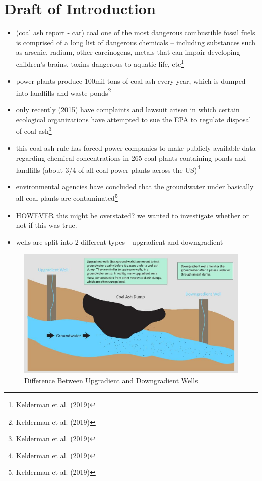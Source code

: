 \documentclass[12pt, twoside]{amherstthesis}
\begin{document}
\hypertarget{draft-of-introduction}{%
\section{Draft of Introduction}\label{draft-of-introduction}}
\begin{itemize}
\item
  (coal ash report - car) coal one of the most dangerous combustible fossil fuels is comprised of a long list of dangerous chemicals -- including substances such as arsenic, radium, other carcinogens, metals that can impair developing children's brains, toxins dangerous to aquatic life, etc\footnote{Kelderman et al. (2019)}
\item
  power plants produce 100mil tons of coal ash every year, which is dumped into landfills and waste ponds\footnote{Kelderman et al. (2019)}
\item
  only recently (2015) have complaints and lawsuit arisen in which certain ecological organizations have attempted to sue the EPA to regulate disposal of coal ash\footnote{Kelderman et al. (2019)}
\item
  this coal ash rule has forced power companies to make publicly available data regarding chemical concentrations in 265 coal plants containing ponds and landfills (about 3/4 of all coal power plants across the US)\footnote{Kelderman et al. (2019)}
\item
  environmental agencies have concluded that the groundwater under basically all coal plants are contaminated\footnote{Kelderman et al. (2019)}
\item
  HOWEVER this might be overstated? we wanted to investigate whether or not if this was true.
\item
  wells are split into 2 different types - upgradient and downgradient
\end{itemize}
\begin{figure}

{\centering \includegraphics[width=1\linewidth]{figures/upgradientdowngradient} 

}

\caption{Difference Between Upgradient and Downgradient Wells}\label{fig:upgradientdowngradient}
\end{figure}
\end{document}
